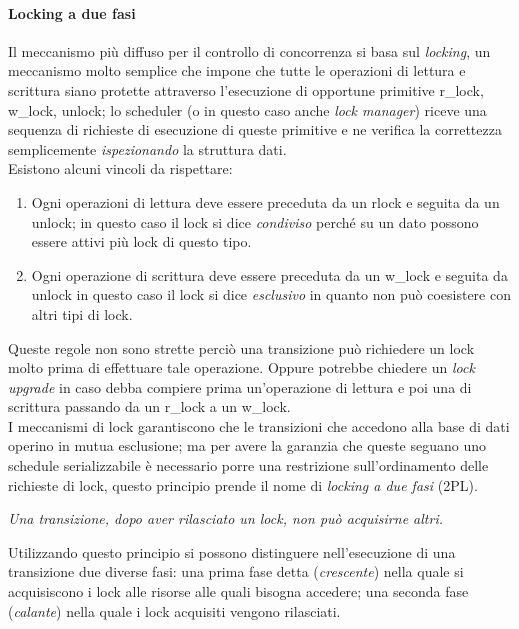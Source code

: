 \paragraph{Locking a due fasi} Il meccanismo più diffuso per il controllo di concorrenza si basa sul \emph{locking}, un meccanismo molto semplice che impone che tutte le operazioni di lettura e scrittura siano protette attraverso l'esecuzione di opportune primitive \textsf{r\_lock, w\_lock, unlock}; lo scheduler (o in questo caso anche \emph{lock manager}) riceve una sequenza di richieste di esecuzione di queste primitive e ne verifica la correttezza semplicemente \emph{ispezionando} la struttura dati.\\
Esistono alcuni vincoli da rispettare:
\begin{enumerate}
\item Ogni operazioni di lettura deve essere preceduta da un \textsf{r\textunderscore lock} e seguita da un \textsf{unlock}; in questo caso il lock si dice \emph{condiviso} perché su un dato possono essere attivi più lock di questo tipo.
\item Ogni operazione di scrittura deve essere preceduta da un \textsf{w\_lock} e seguita da \textsf{unlock} in questo caso il lock si dice \emph{esclusivo} in quanto non può coesistere con altri tipi di lock.
\end{enumerate}
Queste regole non sono strette perciò una transizione può richiedere un lock molto prima di effettuare tale operazione. Oppure potrebbe chiedere un \emph{lock upgrade} in caso debba compiere prima un'operazione di lettura e poi una di scrittura passando da un r\_lock a un w\_lock.\\
I meccanismi di lock garantiscono che le transizioni che accedono alla base di dati operino in mutua esclusione; ma per avere la garanzia che queste seguano uno schedule serializzabile è necessario porre una restrizione sull'ordinamento delle richieste di lock, questo principio prende il nome di \emph{locking a due fasi} (2PL).\\
\begin{center}
\emph{Una transizione, dopo aver rilasciato un lock, non può acquisirne altri.}\\
\end{center}
Utilizzando questo principio si possono distinguere nell'esecuzione di una transizione due diverse fasi: una prima fase detta (\emph{crescente}) nella quale si acquisiscono i lock alle risorse alle quali bisogna accedere; una seconda fase (\emph{calante}) nella quale i lock acquisiti vengono rilasciati.\\
